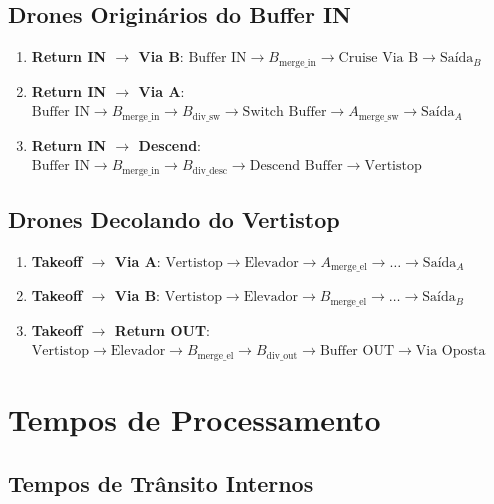 \documentclass[12pt,a4paper]{article}
\begin{document}
\subsection{Drones Originários do Buffer IN}
\begin{enumerate}[resume]
    \item \textbf{Return IN $\to$ Via B}: $\text{Buffer IN} \to B_{\text{merge\_in}} \to \text{Cruise Via B} \to \text{Saída}_B$
    \item \textbf{Return IN $\to$ Via A}: $\text{Buffer IN} \to B_{\text{merge\_in}} \to B_{\text{div\_sw}} \to \text{Switch Buffer} \to A_{\text{merge\_sw}} \to \text{Saída}_A$
    \item \textbf{Return IN $\to$ Descend}: $\text{Buffer IN} \to B_{\text{merge\_in}} \to B_{\text{div\_desc}} \to \text{Descend Buffer} \to \text{Vertistop}$
\end{enumerate}

\subsection{Drones Decolando do Vertistop}
\begin{enumerate}[resume]
    \item \textbf{Takeoff $\to$ Via A}: $\text{Vertistop} \to \text{Elevador} \to A_{\text{merge\_el}} \to \dots \to \text{Saída}_A$
    \item \textbf{Takeoff $\to$ Via B}: $\text{Vertistop} \to \text{Elevador} \to B_{\text{merge\_el}} \to \dots \to \text{Saída}_B$
    \item \textbf{Takeoff $\to$ Return OUT}: $\text{Vertistop} \to \text{Elevador} \to B_{\text{merge\_el}} \to B_{\text{div\_out}} \to \text{Buffer OUT} \to \text{Via Oposta}$
\end{enumerate}

\section{Tempos de Processamento}
\label{sec:tempos}

\subsection{Tempos de Trânsito Internos}
\end{document}
